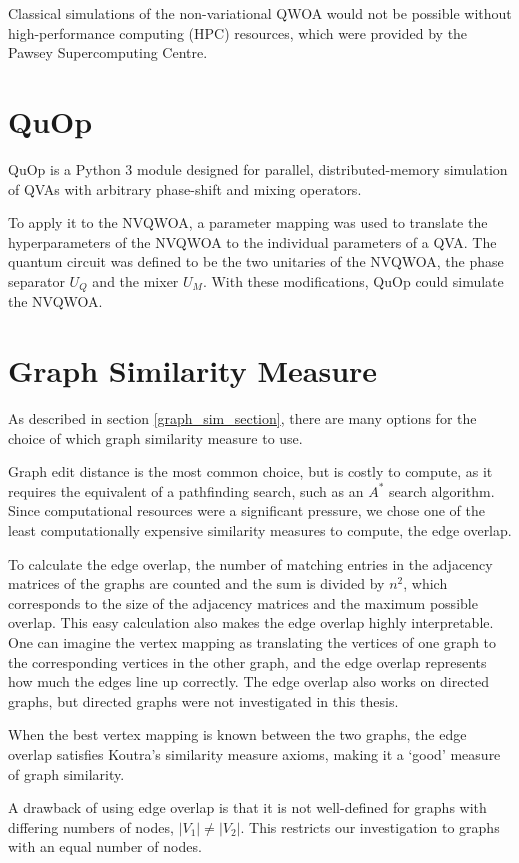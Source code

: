 Classical simulations of the non-variational QWOA would not be possible without high-performance computing (HPC) resources, which were provided by the Pawsey Supercomputing Centre.

\section{QuOp}
QuOp is a Python 3 module designed for parallel, distributed-memory simulation of QVAs with arbitrary phase-shift and mixing operators\cite{QuOp_MPI_paper_variational,QuOp_MPI}. 

To apply it to the NVQWOA, a parameter mapping was used to translate the hyperparameters of the NVQWOA to the individual parameters of a QVA. The quantum circuit was defined to be the two unitaries of the NVQWOA, the phase separator $U_Q$ and the mixer $U_M$. With these modifications, QuOp could simulate the NVQWOA.

\section{Graph Similarity Measure}
As described in section \ref{graph_sim_section}, there are many options for the choice of which graph similarity measure to use.

Graph edit distance is the most common choice, but is costly to compute, as it requires the equivalent of a pathfinding search, such as an $A^*$ search algorithm.
Since computational resources were a significant pressure, we chose one of the least computationally expensive similarity measures to compute, the edge overlap.

To calculate the edge overlap, the number of matching entries in the adjacency matrices of the graphs are counted and the sum is divided by $n^2$, which corresponds to the size of the adjacency matrices and the maximum possible overlap. This easy calculation also makes the edge overlap highly interpretable. One can imagine the vertex mapping as translating the vertices of one graph to the corresponding vertices in the other graph, and the edge overlap represents how much the edges line up correctly. The edge overlap also works on directed graphs, but directed graphs were not investigated in this thesis.

When the best vertex mapping is known between the two graphs, the edge overlap satisfies Koutra's similarity measure axioms, making it a `good' measure of graph similarity.

A drawback of using edge overlap is that it is not well-defined for graphs with differing numbers of nodes, $|V_1|\neq|V_2|$. This restricts our investigation to graphs with an equal number of nodes.


